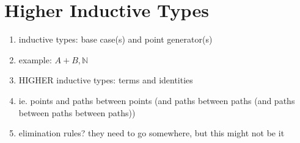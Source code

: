 \section{Higher Inductive Types}
\begin{enumerate}
  \item inductive types: base case(s) and point generator(s)
  \item example: $A + B, \mathbb{N}$
  \item HIGHER inductive types: terms and identities
  \item ie. points and paths between points (and paths between paths (and
    paths between paths between paths))
  \item elimination rules? they need to go somewhere, but this might not be it
\end{enumerate}